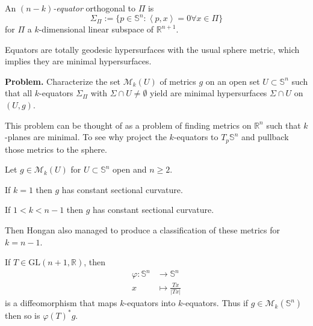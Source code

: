 \bigskip\noindent

\begin{definition}
\label{definition-equator}
An {\it $(n-k)$-equator} orthogonal to $\Pi$
is
$$
\Sigma_\Pi:=\{p\in\mathbb{S}^n:\left\langle{}p,
x\right\rangle{}=0\forall
x\in\Pi\}
$$
for $\Pi$ a $k$-dimensional linear subspace
of $\mathbb{R}^{n+1}$.
\end{definition}

\begin{remark}
\label{remark-equat-total-geode-usual-metr}
Equators are totally geodesic hypersurfaces
with the usual sphere metric, which
implies they are minimal hypersurfaces.
\end{remark}

{\bf Problem.} Characterize the set
$\mathcal{M}_k(U)$ of metrics $g$ on an
open set $U\subset\mathbb{S}^n$ such that all
$k$-equators $\Sigma_\Pi$ with
 $\Sigma\cap U\neq\emptyset$ yield are
 minimal hypersurfaces $\Sigma\cap U$
on $(U,g)$.

\begin{remark}
\label{remark-why-not-Rn}
This problem can be thought of as a problem
of finding metrics on $\mathbb{R}^n$
such that $k$-planes are minimal. To see why
project the $k$-equators to
$T_p\mathbb{S}^n$ and pullback those metrics
to the sphere.
\end{remark}

\medskip\noindent

Let $g\in\mathcal{M}_k(U)$ for
$U\subset\mathbb{S}^n$ open and $n\geq 2$.

\begin{theorem}
\label{theorem-Beltrami-Schafli}
If $k=1$ then $g$ has constant sectional
curvature.
\end{theorem}

\begin{theorem}[Hongan]
\label{theorem-Hongan}
If $1<k<n-1$ then $g$ has constant sectional
curvature.
\end{theorem}

Then Hongan also managed to produce a
classification of these metrics for
$k=n-1$.

\begin{remark}
\label{remark-linea-inver-prese-equat-mg}
If $T\in \text{GL}(n+1,\mathbb{R})$, then
$$
\begin{aligned}
\varphi: \mathbb{S}^n &\longrightarrow
\mathbb{S}^n \\
x &\longmapsto \frac{Tx}{|Tx|}
\end{aligned}
$$
is a diffeomorphism that maps $k$-equators
into $k$-equators. Thus if
$g\in\mathcal{M}_k(\mathbb{S}^n)$ then so is
$\varphi(T)^*g$.
\end{remark}

